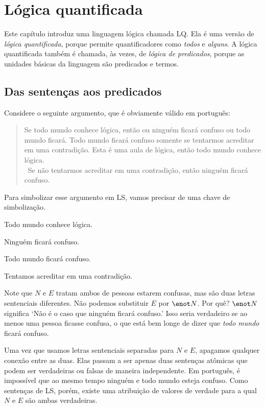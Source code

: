 \chapter{Lógica quantificada}
\label{ch.QL}

Este capítulo introduz uma linguagem lógica chamada LQ. Ela é uma versão de \emph{lógica quantificada}, porque permite quantificadores como \emph{todos} e \emph{alguns}. A lógica quantificada também é chamada, às vezes, de \emph{lógica de predicados}, porque as unidades básicas da linguagem são predicados e termos.


\section{Das sentenças aos predicados}
Considere o seguinte argumento, que é obviamente válido em português:
\begin{quote}
Se todo mundo conhece lógica, então ou ninguém ficará confuso ou todo mundo ficará. Todo mundo ficará confuso somente se tentarmos acreditar em uma contradição. Esta é uma aula de lógica, então todo mundo conhece lógica.\\
\therefore\ Se não tentarmos acreditar em uma contradição, então ninguém ficará confuso.
\end{quote}
Para simbolizar esse argumento em LS, vamos precisar de uma chave de simbolização.
\begin{ekey}
\item[L:] Todo mundo conhece lógica.
\item[N:] Ninguém ficará confuso.
\item[E:] Todo mundo ficará confuso.
\item[B:] Tentamos acreditar em uma contradição.
\end{ekey}
Note que $N$ e $E$ tratam ambos de pessoas estarem confusas, mas são duas letras sentenciais diferentes. Não podemos substituir $E$ por $\enot N$. Por quê? $\enot N$ significa `Não é o caso que ninguém ficará confuso.' Isso seria verdadeiro se ao menos uma pessoa ficasse confusa, o que está bem longe de dizer que \emph{todo mundo} ficará confuso.

Uma vez que usamos letras sentenciais separadas para $N$ e $E$, apagamos qualquer conexão entre as duas. Elas passam a ser apenas duas sentenças atômicas que podem ser verdadeiras ou falsas de maneira independente. Em português, é impossível que ao mesmo tempo ninguém e todo mundo esteja confuso. Como sentenças de LS, porém, existe uma atribuição de valores de verdade para a qual $N$ e $E$ são ambas verdadeiras.

